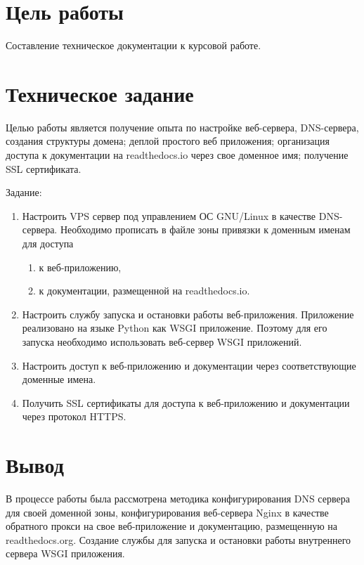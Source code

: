 \documentclass[12pt,a4paper]{article}
\begin{document}
\makeqtitle
\setcounter{page}{2}

\section{Цель работы}

Составление техническое документации к курсовой работе.

\section{Техническое задание}

Целью работы является получение опыта по настройке веб-сервера, DNS-сервера, создания структуры домена;
деплой простого веб приложения; организация доступа к документации на readthedocs.io через
свое доменное имя; получение SSL сертификата.

Задание:

\begin{enumerate}
    \item Настроить VPS сервер под управлением ОС GNU/Linux в качестве DNS-сервера.
          Необходимо прописать в файле зоны привязки к доменным именам для доступа
        \begin{enumerate}
            \item к веб-приложению,
            \item к документации, размещенной на readthedocs.io.
        \end{enumerate}
    \item Настроить службу запуска и остановки работы веб-приложения.
          Приложение реализовано на языке Python как WSGI приложение. Поэтому для его запуска
          необходимо использовать веб-сервер WSGI приложений.
    \item Настроить доступ к веб-приложению и документации через соответствующие доменные имена.
    \item Получить SSL сертификаты для доступа к веб-приложению и документации через протокол HTTPS.
\end{enumerate}

\section{Вывод}

В процессе работы была рассмотрена методика конфигурирования
DNS сервера для своей доменной зоны, конфигурирования веб-сервера Nginx в
качестве обратного прокси на свое веб-приложение и документацию, размещенную
на readthedocs.org. Создание службы для запуска и остановки работы
внутреннего сервера WSGI приложения.
\end{document}
